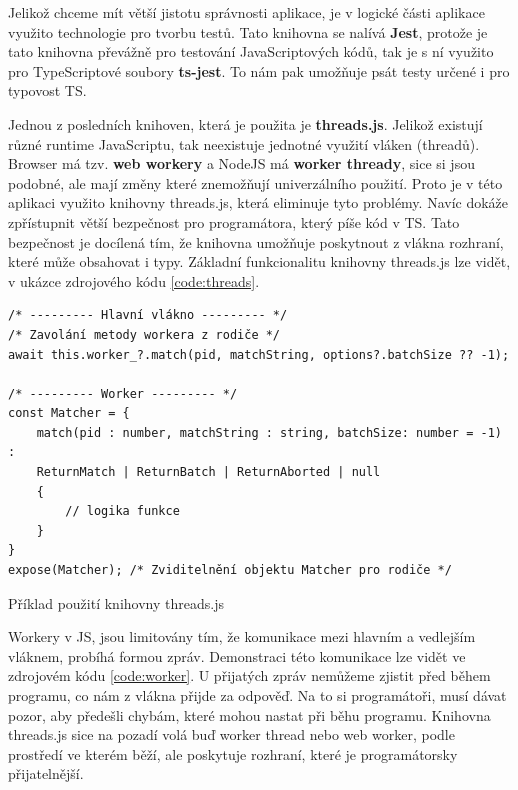 Jelikož chceme mít větší jistotu správnosti aplikace, je v logické části aplikace využito technologie pro tvorbu testů. 
Tato knihovna se nalívá \textbf{Jest}, protože je tato knihovna převážně pro testování JavaScriptových kódů, 
tak je s ní využito pro TypeScriptové soubory \textbf{ts-jest}. To nám pak umožňuje psát testy určené i pro typovost TS.

Jednou z posledních knihoven, která je použita je \textbf{threads.js}. 
Jelikož existují různé runtime JavaScriptu, tak neexistuje jednotné využití vláken (threadů).
Browser má tzv. \textbf{web workery} a NodeJS má \textbf{worker thready}, sice si jsou podobné, ale mají změny které znemožňují univerzálního použití.
Proto je v této aplikaci využito knihovny threads.js, která eliminuje tyto problémy.
Navíc dokáže zpřístupnit větší bezpečnost pro programátora, který píše kód v TS. 
Tato bezpečnost je docílená tím, že knihovna umožňuje poskytnout z vlákna rozhraní, které může obsahovat i typy.
Základní funkcionalitu knihovny threads.js lze vidět, v ukázce zdrojového kódu \ref{code:threads}.

\begin{code}[!ht]
	\begin{verbatim}
/* --------- Hlavní vlákno --------- */
/* Zavolání metody workera z rodiče */
await this.worker_?.match(pid, matchString, options?.batchSize ?? -1);

/* --------- Worker --------- */
const Matcher = {
	match(pid : number, matchString : string, batchSize: number = -1) : 
	ReturnMatch | ReturnBatch | ReturnAborted | null
	{
		// logika funkce
	}
}
expose(Matcher); /* Zviditelnění objektu Matcher pro rodiče */
	\end{verbatim}
	\caption{Příklad použití knihovny threads.js}
	\label{code:threads}
\end{code}

\newpage

Workery v JS, jsou limitovány tím, že komunikace mezi hlavním a vedlejším vláknem, probíhá formou zpráv.
Demonstraci této komunikace lze vidět ve zdrojovém kódu \ref{code:worker}.
U přijatých zpráv nemůžeme zjistit před během programu, co nám z vlákna přijde za odpověď. 
Na to si programátoři, musí dávat pozor, aby předešli chybám, které mohou nastat při běhu programu.
Knihovna threads.js sice na pozadí volá buď worker thread nebo web worker, podle prostředí ve kterém běží, 
ale poskytuje rozhraní, které je programátorsky přijatelnější.

